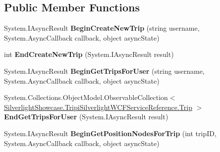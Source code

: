 \subsection*{Public Member Functions}
\begin{DoxyCompactItemize}
\item 
\hypertarget{interface_silverlight_showcase_1_1_tripi_silverlight_w_c_f_service_reference_1_1_tripi_silverlight_w_c_f_service_a05f17ec70141cb954e2e281e31d53c8e}{
System.IAsyncResult {\bfseries BeginCreateNewTrip} (string username, System.AsyncCallback callback, object asyncState)}
\label{interface_silverlight_showcase_1_1_tripi_silverlight_w_c_f_service_reference_1_1_tripi_silverlight_w_c_f_service_a05f17ec70141cb954e2e281e31d53c8e}

\item 
\hypertarget{interface_silverlight_showcase_1_1_tripi_silverlight_w_c_f_service_reference_1_1_tripi_silverlight_w_c_f_service_aafc14c49862673103aa87395c70e8e6a}{
int {\bfseries EndCreateNewTrip} (System.IAsyncResult result)}
\label{interface_silverlight_showcase_1_1_tripi_silverlight_w_c_f_service_reference_1_1_tripi_silverlight_w_c_f_service_aafc14c49862673103aa87395c70e8e6a}

\item 
\hypertarget{interface_silverlight_showcase_1_1_tripi_silverlight_w_c_f_service_reference_1_1_tripi_silverlight_w_c_f_service_a7ab421621f8f4cde0084ff547fc539f8}{
System.IAsyncResult {\bfseries BeginGetTripsForUser} (string username, System.AsyncCallback callback, object asyncState)}
\label{interface_silverlight_showcase_1_1_tripi_silverlight_w_c_f_service_reference_1_1_tripi_silverlight_w_c_f_service_a7ab421621f8f4cde0084ff547fc539f8}

\item 
\hypertarget{interface_silverlight_showcase_1_1_tripi_silverlight_w_c_f_service_reference_1_1_tripi_silverlight_w_c_f_service_adf0d7f930dc6e404a44d036e98edcdcd}{
System.Collections.ObjectModel.ObservableCollection$<$ \hyperlink{class_silverlight_showcase_1_1_tripi_silverlight_w_c_f_service_reference_1_1_trip}{SilverlightShowcase.TripiSilverlightWCFServiceReference.Trip} $>$ {\bfseries EndGetTripsForUser} (System.IAsyncResult result)}
\label{interface_silverlight_showcase_1_1_tripi_silverlight_w_c_f_service_reference_1_1_tripi_silverlight_w_c_f_service_adf0d7f930dc6e404a44d036e98edcdcd}

\item 
\hypertarget{interface_silverlight_showcase_1_1_tripi_silverlight_w_c_f_service_reference_1_1_tripi_silverlight_w_c_f_service_a454efecacae6e290a414d8302b12ecd7}{
System.IAsyncResult {\bfseries BeginGetPositionNodesForTrip} (int tripID, System.AsyncCallback callback, object asyncState)}
\label{interface_silverlight_showcase_1_1_tripi_silverlight_w_c_f_service_reference_1_1_tripi_silverlight_w_c_f_service_a454efecacae6e290a414d8302b12ecd7}


\end{DoxyCompactItemize}
